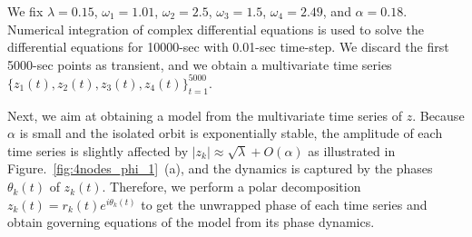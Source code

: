 \documentclass[12pt]{article}
\theoremstyle{plain}
\theoremstyle{definition}
\theoremstyle{remark}
\theoremstyle{remark}
\begin{document}
We fix $\lambda = 0.15 $,  $\omega_1 = 1.01$, $\omega_2 = 2.5$,  $\omega_3 = 1.5$,  $\omega_4 = 2.49$, and $\alpha = 0.18$.  Numerical integration of complex differential equations  is used to solve the differential equations for 10000-sec with 0.01-sec time-step. We discard the first 5000-sec points as transient, and we obtain a multivariate time series  $\{ z_1(t), z_2(t), z_3(t),z_4(t)  \}_{t=1}^{5000}$. 

Next, we aim at obtaining a model from the multivariate time series of $z$. Because $\alpha$ is
small and the isolated orbit is exponentially stable, the amplitude of each time series is slightly affected by $|z_k| \approx \sqrt{\lambda} + O(\alpha)$ as illustrated in Figure.~\ref{fig:4nodes_phi_1}~(a), and the dynamics is captured by the phases $\theta_k(t)$ of $z_k(t)$.   Therefore, we perform a polar decomposition $z_k(t) = r_k(t) e^{i \theta_k(t)}$ to get the unwrapped phase of each time series and obtain governing equations of the model from its phase dynamics.  
\end{document}
